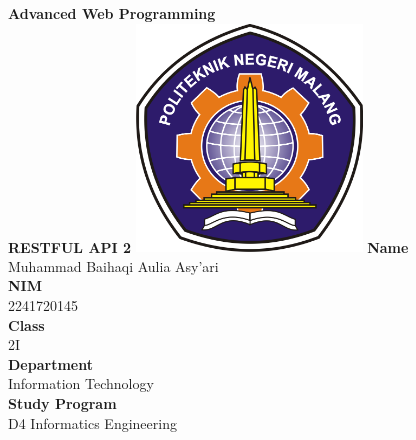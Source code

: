 \documentclass[12pt,titlepage]{article}
\newcommand{\vSubject}{Advanced Web Programming}
\newcommand{\vSubtitle}{RESTFUL API 2}
\newcommand{\vName}{Muhammad Baihaqi Aulia Asy'ari}
\newcommand{\vNIM}{2241720145}
\newcommand{\vClass}{2I}
\newcommand{\vDepartment}{Information Technology}
\newcommand{\vStudyProgram}{D4 Informatics Engineering}
\begin{document}
\begin{titlepage}
    \centering
    \vfill
    {\bfseries\LARGE
        \vSubject\\
        \vskip0.25cm
        \vSubtitle
    }
    \vfill
    \includegraphics[width=6cm]{images/polinema-logo.png}
    \vfill
    {
        \textbf{Name}\\
        \vName\\
        \vskip0.5cm
        \textbf{NIM}\\
        \vNIM\\
        \vskip0.5cm
        \textbf{Class}\\
        \vClass\\
        \vskip0.5cm
        \textbf{Department}\\
        \vDepartment\\
        \vskip0.5cm
        \textbf{Study Program}\\
        \vStudyProgram
    }
\end{titlepage}
\newpage
\end{document}
